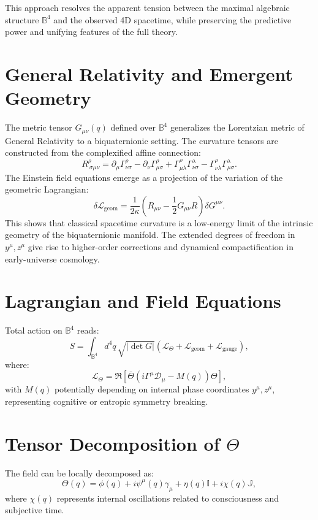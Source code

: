 \documentclass[12pt]{article}
\begin{document}
This approach resolves the apparent tension between the maximal algebraic structure \( \mathbb{B}^4 \) and the observed 4D spacetime, while preserving the predictive power and unifying features of the full theory.

\section{General Relativity and Emergent Geometry}

The metric tensor \( G_{\mu\nu}(q) \) defined over \( \mathbb{B}^4 \) generalizes the Lorentzian metric of General Relativity to a biquaternionic setting. The curvature tensors are constructed from the complexified affine connection:
\[
R^\rho_{\ \sigma\mu\nu} = \partial_\mu \Gamma^\rho_{\nu\sigma} - \partial_\nu \Gamma^\rho_{\mu\sigma} + \Gamma^\rho_{\mu\lambda} \Gamma^\lambda_{\nu\sigma} - \Gamma^\rho_{\nu\lambda} \Gamma^\lambda_{\mu\sigma}.
\]
The Einstein field equations emerge as a projection of the variation of the geometric Lagrangian:
\[
\delta \mathcal{L}_{\text{geom}} = \frac{1}{2\kappa} \left( R_{\mu\nu} - \frac{1}{2} G_{\mu\nu} R \right) \delta G^{\mu\nu}.
\]
This shows that classical spacetime curvature is a low-energy limit of the intrinsic geometry of the biquaternionic manifold. The extended degrees of freedom in \( y^\mu, z^\mu \) give rise to higher-order corrections and dynamical compactification in early-universe cosmology.
\section{Lagrangian and Field Equations}

Total action on \( \mathbb{B}^4 \) reads:
\[
S = \int_{\mathbb{B}^4} d^4q \, \sqrt{|\det G|} \left( \mathcal{L}_{\Theta} + \mathcal{L}_{\text{geom}} + \mathcal{L}_{\text{gauge}} \right),
\]
where:
\[
\mathcal{L}_{\Theta} = \Re\left[ \bar{\Theta} \left( i \Gamma^\mu \mathcal{D}_\mu - M(q) \right) \Theta \right],
\]
with \( M(q) \) potentially depending on internal phase coordinates \( y^\mu, z^\mu \), representing cognitive or entropic symmetry breaking.

\section{Tensor Decomposition of \(\Theta\)}

The field can be locally decomposed as:
\[
\Theta(q) = \phi(q) + i \psi^\mu(q) \gamma_\mu + \eta(q) \mathbb{I} + i \chi(q) \mathbb{J},
\]
where \( \chi(q) \) represents internal oscillations related to consciousness and subjective time.
\end{document}
